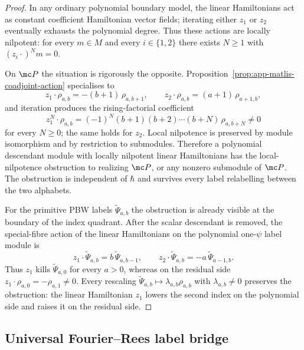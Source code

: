 \begin{proof}
  In any ordinary polynomial boundary model, the linear Hamiltonians
  act as constant coefficient Hamiltonian vector fields; iterating
  either \(z_1\) or \(z_2\) eventually exhausts the polynomial degree.
  Thus these actions are locally nilpotent: for every
  \(m\in M\) and every \(i\in\{1,2\}\) there exists \(N\geq1\) with
  \((z_i\cdot)^N m=0\).

  On \(\mc P\) the situation is rigorously the opposite.
  Proposition~\ref{prop:app-matlis-coadjoint-action} specialises to
  \[
    z_1\cdot\rho_{a,b}=-(b+1)\,\rho_{a,b+1},\qquad
    z_2\cdot\rho_{a,b}=(a+1)\,\rho_{a+1,b},
  \]
  and iteration produces the rising-factorial coefficient
  \[
    z_1^N\cdot\rho_{a,b}
      =(-1)^N(b+1)(b+2)\cdots(b+N)\,\rho_{a,b+N}\neq0
  \]
  for every \(N\geq0\); the same holds for \(z_2\).  Local nilpotence is
  preserved by module isomorphism and by restriction to submodules.
  Therefore a polynomial descendant module with locally nilpotent
  linear Hamiltonians has the local-nilpotence obstruction to realizing
  \(\mc P\), or any nonzero submodule of \(\mc P\).  The obstruction is
  independent of \(\hbar\) and survives
  every label relabelling between the two alphabets.

  For the primitive PBW labels \(\widetilde\Psi_{a,b}\) the obstruction
  is already visible at the boundary of the index quadrant.  After the
  scalar descendant is removed, the special-fibre action of the linear
  Hamiltonians on the polynomial one-\(\psi\) label module is
  \[
    z_1\cdot\widetilde\Psi_{a,b}=b\,\widetilde\Psi_{a,b-1},
    \qquad
    z_2\cdot\widetilde\Psi_{a,b}=-a\,\widetilde\Psi_{a-1,b}.
  \]
  Thus \(z_1\) kills \(\widetilde\Psi_{a,0}\) for every \(a>0\), whereas
  on the residual side \(z_1\cdot\rho_{a,0}=-\rho_{a,1}\neq0\).  Every
  rescaling \(\widetilde\Psi_{a,b}\mapsto\lambda_{a,b}\rho_{a,b}\) with
  \(\lambda_{a,b}\neq0\) preserves the obstruction: the linear
  Hamiltonian \(z_1\) lowers the second index on the polynomial side
  and raises it on the residual side.
\end{proof}

\subsection{Universal Fourier--Rees label bridge}
\label{ssec:app-matlis-fourier-rees}

